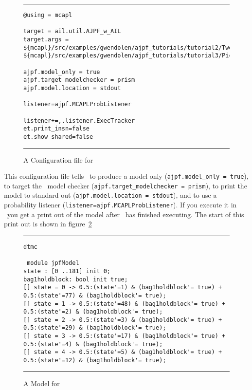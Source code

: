 \documentclass[a4]{article}
\begin{document}
\begin{figure}[htb]
\noindent\rule{\textwidth}{1pt}
\begin{small}
\begin{verbatim}
@using = mcapl

target = ail.util.AJPF_w_AIL
target.args = ${mcapl}/src/examples/gwendolen/ajpf_tutorials/tutorial2/TwoPickUpAgents.ail,
${mcapl}/src/examples/gwendolen/ajpf_tutorials/tutorial3/PickUpAgent.psl,1

ajpf.model_only = true
ajpf.target_modelchecker = prism
ajpf.model.location = stdout

listener=ajpf.MCAPLProbListener

listener+=,.listener.ExecTracker
et.print_insn=false
et.show_shared=false
\end{verbatim}
\end{small}
\rule{\textwidth}{1pt}
\caption{A Configuration file for \prism}
\label{fig:prism_config1}
\end{figure}

This configuration file tells \ajpf\ to produce a model only (\texttt{ajpf.model\_only = true}), to target the \prism\ model checker (\texttt{ajpf.target\_modelchecker = prism}), to print the model to standard out (\texttt{ajpf.model.location = stdout}), and to use a probability listener (\texttt{listener=ajpf.MCAPLProbListener}).  If you execute it in \ajpf\ you get a print out of the model after \ajpf\  has finished executing.  The start of this print out is shown in figure~\ref{fig:prism_output1}

\begin{figure}[htb]
\noindent\rule{\textwidth}{1pt}
\begin{small}
\begin{verbatim}
dtmc

 module jpfModel
state : [0 ..181] init 0;
bag1holdblock: bool init true;
[] state = 0 -> 0.5:(state'=1) & (bag1holdblock'= true) + 0.5:(state'=77) & (bag1holdblock'= true);
[] state = 1 -> 0.5:(state'=48) & (bag1holdblock'= true) + 0.5:(state'=2) & (bag1holdblock'= true);
[] state = 2 -> 0.5:(state'=3) & (bag1holdblock'= true) + 0.5:(state'=29) & (bag1holdblock'= true);
[] state = 3 -> 0.5:(state'=17) & (bag1holdblock'= true) + 0.5:(state'=4) & (bag1holdblock'= true);
[] state = 4 -> 0.5:(state'=5) & (bag1holdblock'= true) + 0.5:(state'=12) & (bag1holdblock'= true);
\end{verbatim}
\end{small}
\rule{\textwidth}{1pt}
\caption{A Model for \prism}
\label{fig:prism_output1}
\end{figure}
\end{document}
